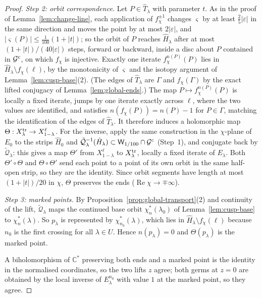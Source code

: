 \documentclass[11pt]{amsart}
\theoremstyle{definition}
\begin{document}
\begin{proof}
\emph{Step 2: orbit correspondence.}  Let $P\in\hat T_\lambda$ with parameter $t$.  As in
the proof of Lemma~\ref{lem:change-line}, each application of $f_\chi^{\pm1}$ changes
$\varsigma$ by at least $\tfrac25|\varepsilon|$ in the same direction and moves the point by at most
$2|\varepsilon|$, and $|\varsigma(P)|\le\tfrac1{100}(1+|t|)$; so the orbit of $P$ reaches $\hat H_\lambda$
after at most $(1+|t|)/(40|\varepsilon|)$ steps, forward or backward, inside a disc about
$P$ contained in $\mathcal G^{\rm c}$, on which $f_\chi$ is injective.  Exactly one iterate
$f_\chi^{n(P)}(P)$ lies in $\hat H_\lambda\setminus f_\chi(\ell)$, by the monotonicity of $\varsigma$ and the
isotopy argument of Lemma~\ref{lem:cusp-base}(2).  (The edges of $\hat T_\lambda$ are $\Gamma$
and $f_\chi(\Gamma)$ by the exact lifted conjugacy of Lemma~\ref{lem:global-ends}.)  The
map $P\mapsto f_\chi^{n(P)}(P)$ is
locally a fixed iterate, jumps by one iterate exactly across $\ell$, where the
two values are identified, and satisfies $n(f_\chi(P))=n(P)-1$ for $P\in\Gamma$,
matching the identification of the edges of $\hat T_\lambda$.  It therefore induces a
holomorphic map $\Theta:X^{\rm tr}_\lambda\to X^\ell_{1-\lambda}$.  For the inverse, apply the same
construction in the $\chi$-plane of $E_0$ to the strips $\hat H_0$ and
$\tilde{\mathcal Q}_\lambda^{-1}(\hat H_\lambda)\subset\mathsf W_{1/100}\cap\mathcal G^{\rm c}$ (Step~1), and conjugate back by $\tilde{\mathcal Q}_\lambda$:
this gives a map $\Theta'$ from $X^\ell_{1-\lambda}$ to $X^{\rm tr}_\lambda$, locally a fixed iterate of
$E_\lambda$.  Both $\Theta'\circ\Theta$ and $\Theta\circ\Theta'$ send each point to a point of its own
orbit in the same half-open strip, so they are the identity.
Since orbit segments have length at most $(1+|t|)/20$ in $\chi$, $\Theta$ preserves the
ends ($\operatorname{Re}\chi\to\mp\infty$).

\emph{Step 3: marked points.}  By Proposition~\ref{prop:global-transport}(2) and
continuity of the lift, $\tilde{\mathcal Q}_\lambda$ maps the continued base orbit $\chi^*_n(\lambda_0)$ of
Lemma~\ref{lem:cusp-base} to $\chi^*_n(\lambda)$.  So $p_\lambda$ is represented by
$\chi^*_{n_0}(\lambda)$, which lies in $\hat H_\lambda\setminus f_\chi(\ell)$ because $n_0$ is the first crossing for
all $\lambda\in U$.  Hence $n(p_\lambda)=0$ and $\Theta(p_\lambda)$ is the marked point.

A biholomorphism of $\mathbb C^*$ preserving both ends and a marked point is the
identity in the normalised coordinates, so the two lifts $z$ agree; both
germs at $z=0$ are obtained by the local inverse of $E_\lambda^{n_0}$ with value $1$
at the marked point, so they agree.
\end{proof}
\end{document}
